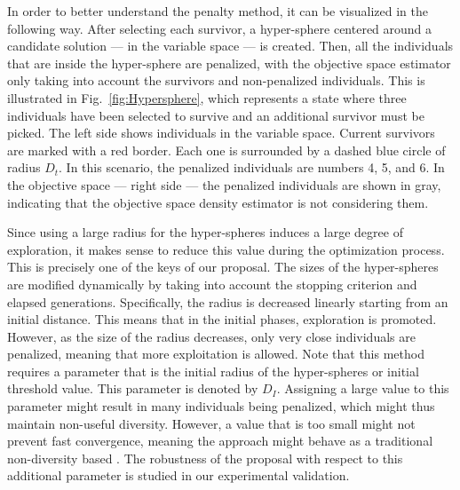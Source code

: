 In order to better understand the penalty method, it can be visualized in the following way.
%
After selecting each survivor, a hyper-sphere 
centered around a candidate solution --- in the variable space --- is created.
%
Then, all the individuals that are inside the hyper-sphere are penalized, with the objective space estimator only taking 
into account the survivors and non-penalized individuals.
%
This is illustrated in Fig.~\ref{fig:Hypersphere}, which represents a state where three individuals have been 
selected to survive and an additional survivor must be picked.
%
The left side shows individuals in the variable space.
%
Current survivors are marked with a red border. Each one is surrounded by a dashed blue circle of 
radius $D_t$.
%
In this scenario, the penalized individuals are numbers 4, 5, and 6.
%
In the objective space --- right side --- the penalized individuals are shown in gray, indicating
that the objective space density estimator is not considering them.

Since using a large radius for the hyper-spheres induces a large degree of 
exploration, it makes sense to reduce this value during the optimization process.
%
This is precisely one of the keys of our proposal.
%
The sizes of the hyper-spheres are modified dynamically by taking into account the stopping 
criterion and elapsed generations.
%
Specifically, the radius is decreased linearly starting from an initial distance.
%
This means that in the initial phases, exploration is promoted.
%
However, as the size of the radius decreases, only very close individuals are penalized, meaning that more 
exploitation is allowed.
%
Note that this method requires a parameter that is the initial radius of the 
hyper-spheres or initial threshold value.
%
This parameter is denoted by $D_I$. 
%
Assigning a large value to this parameter might result in many individuals being penalized, which might thus maintain non-useful diversity.
%
However, a value that is too small might not prevent fast convergence, meaning the approach  
might behave as a traditional non-diversity based \MOEA{}.
%
The robustness of the proposal with respect to this additional parameter is studied in our experimental validation.

